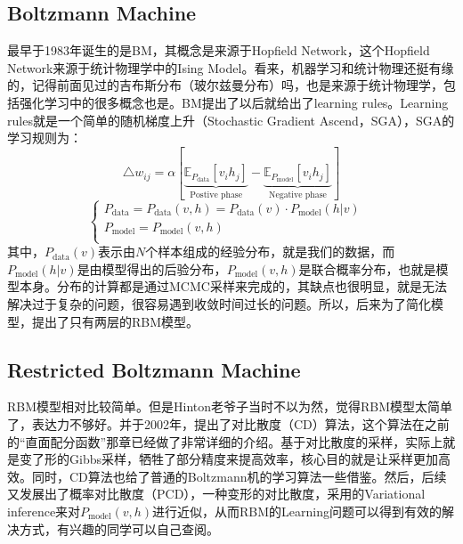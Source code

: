 \documentclass[a4paper]{article}
\begin{document}
\subsection{Boltzmann Machine}
最早于1983年诞生的是BM，其概念是来源于Hopfield Network，这个Hopfield Network来源于统计物理学中的Ising Model。看来，机器学习和统计物理还挺有缘的，记得前面见过的吉布斯分布（玻尔兹曼分布）吗，也是来源于统计物理学，包括强化学习中的很多概念也是。BM提出了以后就给出了learning rules。Learning rules就是一个简单的随机梯度上升（Stochastic Gradient Ascend，SGA），SGA的学习规则为：
\begin{equation}
    \triangle w_{ij} = \alpha \left[ \underbrace{\mathbb{E}_{P_{\text{data}}}[v_ih_j]}_{\text{Postive phase}} - \underbrace{\mathbb{E}_{P_{\text{model}}}[v_ih_j]}_{\text{Negative phase}} \right]
\end{equation}
\begin{equation}
    \left\{
    \begin{array}{ll}
      P_{\text{data}} = P_{\text{data}}(v,h) = P_{\text{data}}(v) \cdot P_{\text{model}}(h|v) & \\
      P_{\text{model}} = P_{\text{model}}(v,h) & \\
    \end{array}
    \right.
\end{equation}
其中，$P_{\text{data}}(v)$表示由$N$个样本组成的经验分布，就是我们的数据，而$P_{\text{model}}(h|v)$是由模型得出的后验分布，$P_{\text{model}}(v,h)$是联合概率分布，也就是模型本身。分布的计算都是通过MCMC采样来完成的，其缺点也很明显，就是无法解决过于复杂的问题，很容易遇到收敛时间过长的问题。所以，后来为了简化模型，提出了只有两层的RBM模型。

\subsection{Restricted Boltzmann Machine}
RBM模型相对比较简单。但是Hinton老爷子当时不以为然，觉得RBM模型太简单了，表达力不够好。并于2002年，提出了对比散度（CD）算法，这个算法在之前的“直面配分函数”那章已经做了非常详细的介绍。基于对比散度的采样，实际上就是变了形的Gibbs采样，牺牲了部分精度来提高效率，核心目的就是让采样更加高效。同时，CD算法也给了普通的Boltzmann机的学习算法一些借鉴。然后，后续又发展出了概率对比散度（PCD），一种变形的对比散度，采用的Variational inference来对$P_{\text{model}}(v,h)$进行近似，从而RBM的Learning问题可以得到有效的解决方式，有兴趣的同学可以自己查阅。
\end{document}
